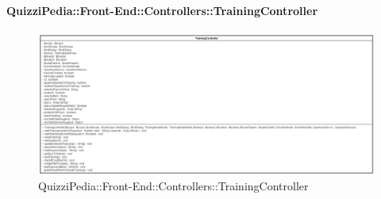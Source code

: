 \paragraph{QuizziPedia::Front-End::Controllers::TrainingController}
\begin{figure} [ht]
	\centering
	\includegraphics[scale=0.25]{UML/Classi/Front-End/QuizziPedia_Front-end_Controller_TrainingController.png}
	\caption{QuizziPedia::Front-End::Controllers::TrainingController}
\end{figure} \FloatBarrier
